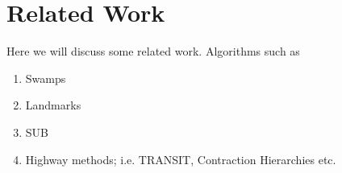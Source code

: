 \section{Related Work}
\label{sec::relatedwork}
Here we will discuss some related work. Algorithms such as
\begin{enumerate}
\item{Swamps}
\item{Landmarks}
\item{SUB}
\item{Highway methods; i.e. TRANSIT, Contraction Hierarchies etc.}
\end{enumerate}
